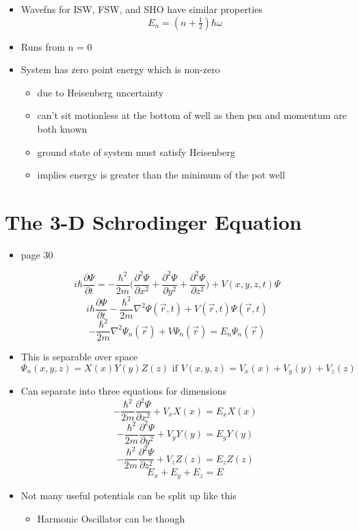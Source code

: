 \documentclass[a4paper,11pt,normalem]{article}
\begin{document}
\begin{itemize}
\item
  Wavefns for ISW, FSW, and SHO have similar properties \[
  E_n = (n + \tfrac{1}{2})\hbar\omega
  \]
\item
  Runs from n = 0
\item
  System has zero point energy which is non-zero
  \begin{itemize}
  \item
    due to Heisenberg uncertainty
  \item
    can't sit motionless at the bottom of well as then psn and momentum
    are both known
  \item
    ground state of system must satisfy Heisenberg
  \item
    implies energy is greater than the minimum of the pot well
  \end{itemize}
\end{itemize}

\section{The 3-D Schrodinger Equation}\label{the-3-d-schrodinger-equation}

\begin{itemize}
\item
  page 30
\end{itemize}
\[
    i\hbar\frac{\partial \Psi}{\partial t} = -\frac{\hbar^2}{2m}\Big(\frac{\partial^2 \Psi}{\partial x^2} + \frac{\partial^2 \Psi}{\partial y^2} + \frac{\partial^2 \Psi}{\partial z^2} \Big) + V(x, y, z, t)\Psi
\] \[
    i\hbar\frac{\partial \Psi}{\partial t} -\frac{\hbar^2}{2m}\nabla^{2}\Psi(\vec{r}, t) + V(\vec{r}, t)\Psi(\vec{r}, t)
\] \[
    -\frac{\hbar^2}{2m}\nabla^{2}\Psi_{n}(\vec{r}) + V\Psi_{n}(\vec{r}) = E_{n}\Psi_{n}(\vec{r})
\]

\begin{itemize}
\item
  This is separable over space \[
  \Psi_n(x, y,  z) = X(x)Y(y)Z(z) \text{ if } V(x,y,z) = V_{x}(x) + V_{y}(y) + V_{z}(z)
  \]
\item
  Can separate into three equations for dimensions \[
  -\frac{\hbar^2}{2m}\frac{\partial^2 \Psi}{\partial x^2} + V_{x}X(x) = E_{x}X(x)
  \] \[
  -\frac{\hbar^2}{2m}\frac{\partial^2 \Psi}{\partial y^2} + V_{y}Y(y) = E_{y}Y(y)
  \] \[
  -\frac{\hbar^2}{2m}\frac{\partial^2 \Psi}{\partial z^2} + V_{z}Z(z) = E_{z}Z(z)
  \] \[
  E_x + E_y + E_z = E
  \]
\item
  Not many useful potentials can be split up like this

  \begin{itemize}
  \item
    Harmonic Oscillator can be though
  \end{itemize}
\end{itemize}
\end{document}

